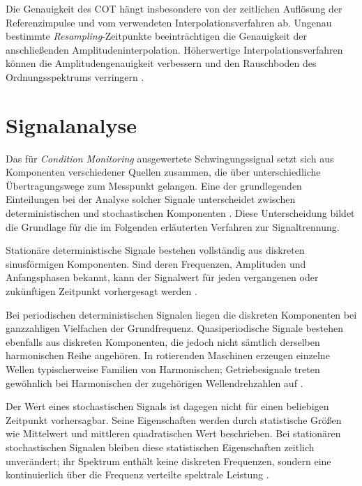 Die Genauigkeit des COT hängt insbesondere von der zeitlichen Auflösung der
Referenzimpulse und vom verwendeten Interpolationsverfahren ab. Ungenau
bestimmte \emph{Resampling}-Zeitpunkte beeinträchtigen die Genauigkeit der
anschließenden Amplitudeninterpolation. Höherwertige Interpolationsverfahren
können die Amplitudengenauigkeit verbessern und den
Rauschboden des Ordnungsspektrums verringern
\cite[S.~193--194, Abschn.~3.1, Abb.~5--7;
S.~196--201, Abschn.~3.4--3.5 und 4, Abb.~8--13]
{fyfeANALYSISCOMPUTEDORDER1997}.

\section{Signalanalyse}
\label{sec:signalseparation}

Das für \emph{Condition Monitoring} ausgewertete Schwingungssignal setzt sich aus Komponenten
verschiedener Quellen zusammen, die über unterschiedliche Übertragungswege zum Messpunkt
gelangen. Eine der grundlegenden Einteilungen bei der Analyse solcher Signale unterscheidet
zwischen deterministischen und stochastischen Komponenten
\cite[S.~11, Abschn.~1]{randallComparisonMethodsSeparation2011}.
Diese Unterscheidung bildet die Grundlage für die im Folgenden erläuterten
Verfahren zur Signaltrennung.

Stationäre deterministische Signale bestehen vollständig aus diskreten
sinusförmigen Komponenten. Sind deren Frequenzen, Amplituden und Anfangsphasen bekannt,
kann der Signalwert für jeden vergangenen oder zukünftigen Zeitpunkt vorhergesagt werden
\cite[S.~26, Abschn.~2.1 und Abb.~2.1]
{randallVibrationbasedConditionMonitoring2022}.

Bei periodischen deterministischen Signalen liegen die diskreten Komponenten bei
ganzzahligen Vielfachen der Grundfrequenz. Quasiperiodische Signale bestehen ebenfalls aus
diskreten Komponenten, die jedoch nicht sämtlich derselben harmonischen Reihe angehören. In
rotierenden Maschinen erzeugen einzelne Wellen typischerweise Familien von Harmonischen;
Getriebesignale treten gewöhnlich bei Harmonischen der zugehörigen Wellendrehzahlen auf
\cite[S.~25, Abschn.~2.1; S.~28, Abschn.~2.1.1]
{randallVibrationbasedConditionMonitoring2022}.

Der Wert eines stochastischen Signals ist dagegen nicht für einen beliebigen Zeitpunkt
vorhersagbar. Seine Eigenschaften werden durch statistische Größen wie Mittelwert und
mittleren quadratischen Wert beschrieben. Bei stationären stochastischen Signalen bleiben diese
statistischen Eigenschaften zeitlich unverändert; ihr Spektrum enthält keine diskreten
Frequenzen, sondern eine kontinuierlich über die Frequenz verteilte spektrale Leistung
\cite[S.~26, Abschn.~2.1; S.~28--29, Abschn.~2.1.2]
{randallVibrationbasedConditionMonitoring2022}.

